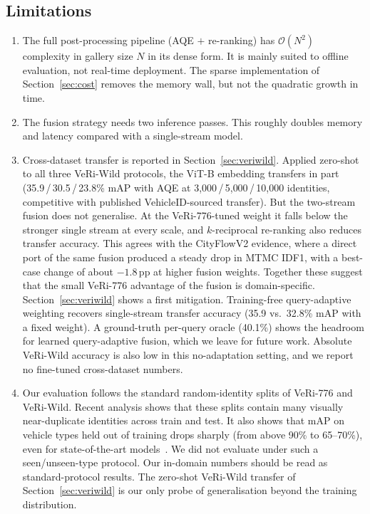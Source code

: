 \subsection{Limitations}
\label{sec:limitations}
\begin{enumerate}
  \item The full post-processing pipeline (AQE $+$ re-ranking) has $\mathcal{O}(N^{2})$ complexity in gallery size $N$ in its dense form. It is mainly suited to offline evaluation, not real-time deployment. The sparse implementation of Section~\ref{sec:cost} removes the memory wall, but not the quadratic growth in time.
  \item The fusion strategy needs two inference passes. This roughly doubles memory and latency compared with a single-stream model.
  \item Cross-dataset transfer is reported in Section~\ref{sec:veriwild}. Applied zero-shot to all three VeRi-Wild protocols, the ViT-B embedding transfers in part (35.9\,/\,30.5\,/\,23.8\% mAP with AQE at 3{,}000\,/\,5{,}000\,/\,10{,}000 identities, competitive with published VehicleID-sourced transfer). But the two-stream fusion does not generalise. At the VeRi-776-tuned weight it falls below the stronger single stream at every scale, and $k$-reciprocal re-ranking also reduces transfer accuracy. This agrees with the CityFlowV2 evidence, where a direct port of the same fusion produced a steady drop in MTMC IDF1, with a best-case change of about $-1.8$\,pp at higher fusion weights. Together these suggest that the small VeRi-776 advantage of the fusion is domain-specific. Section~\ref{sec:veriwild} shows a first mitigation. Training-free query-adaptive weighting recovers single-stream transfer accuracy (35.9 vs.\ 32.8\% mAP with a fixed weight). A ground-truth per-query oracle (40.1\%) shows the headroom for learned query-adaptive fusion, which we leave for future work. Absolute VeRi-Wild accuracy is also low in this no-adaptation setting, and we report no fine-tuned cross-dataset numbers.
  \item Our evaluation follows the standard random-identity splits of VeRi-776 and VeRi-Wild. Recent analysis shows that these splits contain many visually near-duplicate identities across train and test. It also shows that mAP on vehicle types held out of training drops sharply (from above 90\% to 65--70\%), even for state-of-the-art models~\cite{benmabrouk2026genlimits}. We did not evaluate under such a seen/unseen-type protocol. Our in-domain numbers should be read as standard-protocol results. The zero-shot VeRi-Wild transfer of Section~\ref{sec:veriwild} is our only probe of generalisation beyond the training distribution.

\end{enumerate}
